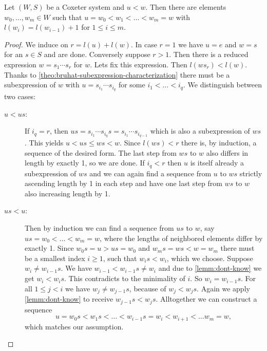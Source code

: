 \begin{prop}
	Let $(W,S)$ be a Coxeter system and $u < w$. Then there are elements $w_0,\ldots,w_m \in W$ such that $u = w_0 < w_1 < \ldots < w_m = w$ with $l(w_i) = l(w_{i-1}) + 1$ for $1 \leq i \leq m$.

	\begin{proof}
		We induce on $r = l(u) + l(w)$. In case $r = 1$ we have $u = e$ and $w = s$ for an $s \in S$ and are done. Conversely suppose $r > 1$. Then there is a reduced expression $w = s_1 \cdots s_r$ for $w$. Lets fix this expression. Then $l(w s_r) < l(w)$. Thanks to \ref{theo:bruhat-subexpression-characterization} there must be a subexpression of $w$ with $u = s_{i_1} \cdots s_{i_q}$ for some $i_1 < \ldots < i_q$. We distinguish between two cases:

		\begin{description}
			\item[$u < us$:] If $i_q = r$, then $us = s_{i_1} \cdots s_{i_q} s = s_{i_1} \cdots s_{i_{q-1}}$ which is also a subexpression of $ws$. This yields $u < us \leq ws < w$. Since $l(ws) < r$ there is, by induction, a sequence of the desired form. The last step from $ws$ to $w$ also differs in length by exactly 1, so we are done. If $i_q < r$ then $u$ is itself already a subexpression of $ws$ and we can again find a sequence from $u$ to $ws$ strictly ascending length by 1 in each step and have one last step from $ws$ to $w$ also increasing length by 1.
			\item[$us < u$:] Then by induction we can find a sequence from $us$ to $w$, say $us = w_0 < \ldots < w_m = w$, where the lengths of neighbored elements differ by exactly 1. Since $w_0 s = u > us = w_0$ and $w_m s = ws < w = w_m$ there must be a smallest index $i \geq 1$, such that $w_i s < w_i$, which we choose. Suppose $w_i \neq w_{i-1} s$. We have $w_{i-1} < w_{i-1}s \neq w_i$ and due to \ref{lemm:dont-know} we get $w_i < w_i s$. This contradicts to the minimality of $i$. So $w_i = w_{i-1} s$. For all $1 \leq j < i$ we have $w_j \neq w_{j-1} s$, because of $w_j < w_j s$. Again we apply \ref{lemm:dont-know} to receive $w_{j-1} s < w_j s$. Alltogether we can construct a sequence
			$$ u = w_0 s < w_1 s < \ldots < w_{i-1} s = w_i < w_{i+1} < \ldots w_m = w, $$
			which matches our assumption. \qedhere
		\end{description}
	\end{proof}
\end{prop}

